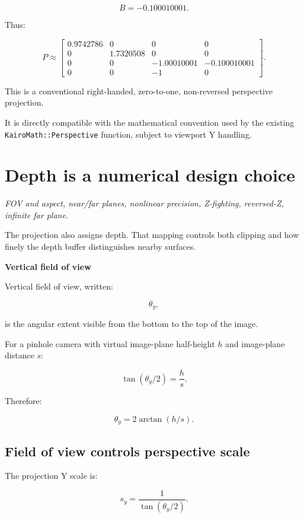\[
 B=-0.100010001.
\]

Thus:

\[
 \boxed{ P\approx \begin{bmatrix} 0.9742786&0&0&0\\ 0&1.7320508&0&0\\ 0&0&-1.00010001&-0.100010001\\ 0&0&-1&0 \end{bmatrix} }.
\]

This is a conventional right-handed, zero-to-one, non-reversed perspective projection.

It is directly compatible with the mathematical convention used by the existing \texttt{KairoMath::Perspective} function, subject to viewport Y handling.

\section{Depth is a numerical design choice}\label{02-foundations-ii-ch033-depth-is-a-numerical-design-choice}

\emph{FOV and aspect, near/far planes, nonlinear precision, Z-fighting, reversed-Z, infinite far plane.}

The projection also assigns depth. That mapping controls both clipping and how finely the depth buffer distinguishes nearby surfaces.

\textbf{Vertical field of view}

Vertical field of view, written:

\[
 \boxed{\theta_y},
\]

is the angular extent visible from the bottom to the top of the image.

For a pinhole camera with virtual image-plane half-height \(h\) and image-plane distance \(s\):

\[
 \boxed{ \tan(\theta_y/2)=\frac hs }.
\]

Therefore:

\[
 \boxed{ \theta_y=2\arctan(h/s) }.
\]

\subsection{Field of view controls perspective scale}\label{02-foundations-ii-ch033-field-of-view-controls-perspective-scale}

The projection Y scale is:

\[
 \boxed{ s_y=\frac1{\tan(\theta_y/2)} }.
\]

